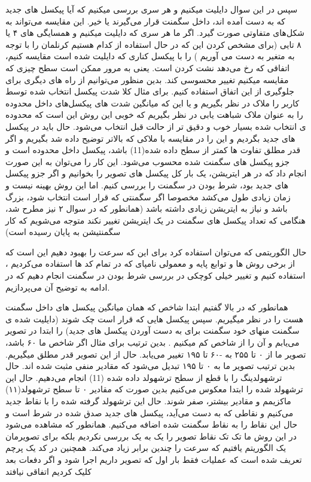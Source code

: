 \documentclass[12pt]{article}
\begin{document}
	 سپس در این سوال دایلیت میکنیم و هر سری بررسی میکنیم که آیا پیکسل های جدید که به دست آمده اند، داخل سگمنت قرار می‌گیرند یا خیر. این مقایسه می‌تواند به شکل‌های متفاوتی صورت گیرد. اگر ما هر سری که دایلیت میکنیم و همسایگی های ۴ یا ۸ تایی (برای مشخص کردن این که در حال استفاده از کدام هستیم کرنلمان را با توجه به متغیر
	به دست می آوریم ) 
	را با پیکسل کناری که دایلیت شده است مقایسه کنیم، اتفاقی که رخ می‌دهد نشت کردن است. یعنی به مرور ممکن است سطح چیزی که مقایسه میکنیم تغییر محسوسی کند. بدین منظور می‌توانیم از راه های دیگری برای جلوگیری از این اتفاق استفاده کنیم. برای مثال کلا شدت پیکسل انتخاب شده توسط کاربر را ملاک در نظر بگیریم و یا این که میانگین شدت های پیکسل‌های داخل محدوده را به عنوان ملاک شباهت یابی در نظر بگیریم که خوبی این روش این است که محدوده ی انتخاب شده بسیار خوب و دقیق تر از حالت قبل انتخاب می‌شود. حال باید در پیکسل های جدید بگردیم و این 
	را در مقایسه با ملاکی که بالاتر توضیح داده شد بگیریم و اگر قدر مطلق تفاوت ها کمتر از سطح داده شده(11) باشد، پیکسل داخل محدوده است و جزو پیکسل های سگمنت شده محسوب می‌شود. این کار را می‌توان به این صورت انجام داد که در هر ایتریشن، یک بار کل پیکسل های تصویر را بخوانیم و اگر جزو پیکسل های جدید بود، شرط بودن در سگمنت را بررسی کنیم. اما این روش بهینه نیست و زمان زیادی طول می‌کشد مخصوصا اگر سگمنتی که قرار است انتخاب شود، بزرگ باشد و نیاز به ایتریشن زیادی داشته باشد (همانطور که در سوال ۲ نیز مطرح شد، هنگامی که تعداد پیکسل های سگمنت در یک ایتریشن تغییر نکند متوجه می‌شویم که کار سگمنتیشن به پایان رسیده است) 
	
	حال الگوریتمی که می‌توان استفاده کرد برای این که سرعت را بهبود دهیم این است که از برخی روش ها و توابع پایه و معمولی نامپای که در تمام کد ها استفاده می‌کردیم ، استفاده کنیم و تغییر خیلی کوچکی در بررسی شرط بودن در سگمنت انجام دهیم که در ادامه به توضیح آن می‌پردازیم.
	
	همانطور که در بالا گفتیم ابتدا شاخص که همان میانگین پیکسل های داخل سگمنت هست را در نظر میگیریم. سپس پیکسل هایی که قرار است چک شوند (دایلیت شده ی سگمنت منهای خود سگمنت برای به دست آوردن پیکسل های جدید) را ابتدا در تصویر می‌یابم و آن را از شاخص کم میکنیم . بدین ترتیب برای مثال اگر شاخص ما ۶۰ باشد، تصویر ما از ۰ تا ۲۵۵ به -۶۰ تا ۱۹۵ تغییر می‌یابد. حال از این تصویر قدر مطلق میگیریم. بدین ترتیب تصویر ما به ۰ تا ۱۹۵ تبدیل می‌شود که مقادیر منفی مثبت شده اند. حال ترشهولدینگ را با قطع از سطح ترشهولد داده شده (11) انجام می‌دهیم. حال این ترشهولد شده را ابتدا معکوس می‌کنیم بدین صورت که مقادیر ۰ تا سطح ترشهولد(۱۱) ماکزیمم و مقادیر بیشتر، صفر شوند. حال این ترشهولد گرفته شده را با نقاط جدید 
	می‌کنیم و نقاطی که به دست می‌آید، پیکسل های جدید صدق شده در شرط است و حال این نقاط را به نقاط سگمنت شده اضافه می‌کنیم. همانطور که مشاهده می‌شود در این روش ما تک تک نقاط تصویر را یک به یک بررسی نکردیم بلکه برای تصویرمان یک الگوریتم یافتیم که سرعت را چندین برابر زیاد می‌کند. 
	همچنین در کد یک پرچم تعریف شده است که عملیات فقط بار اول که تصویر داریم اجرا شود و اگر دفعات بعد کلیک کردیم اتفاقی نیافتد
\end{document}

